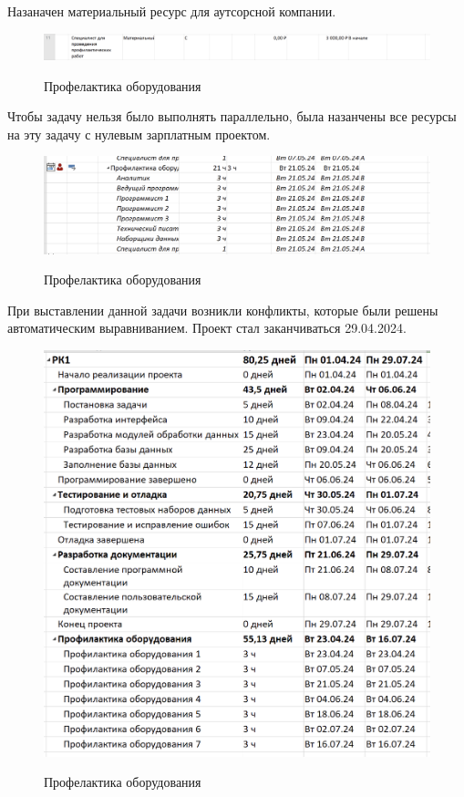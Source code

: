 Назаначен материальный ресурс для аутсорсной компании.


\begin{figure}[ht!]
	\includegraphics[width=0.75\linewidth]{assets/images/8.2-outsource.png}
	\label{fig:r2}
	\caption{Профелактика оборудования}
\end{figure}
\FloatBarrier

Чтобы задачу нельзя было выполнять параллельно, была назанчены все ресурсы на эту задачу с нулевым зарплатным проектом.

\begin{figure}[ht!]
	\includegraphics[width=0.75\linewidth]{assets/images/8.3-conflicts.png}
	\label{fig:r2}
	\caption{Профелактика оборудования}
\end{figure}
\FloatBarrier

При выставлении данной задачи возникли конфликты, которые были решены автоматическим выравниванием.
Проект стал заканчиваться 29.04.2024.

\begin{figure}[ht!]
	\includegraphics[width=0.75\linewidth]{assets/images/8.4-conf.png}
	\label{fig:r2}
	\caption{Профелактика оборудования}
\end{figure}
\FloatBarrier

